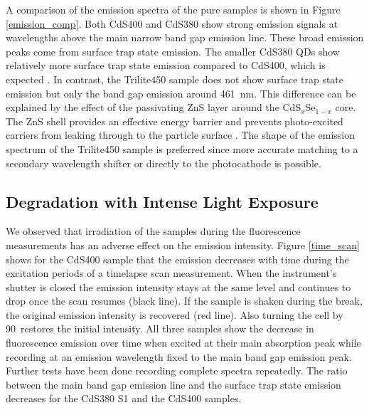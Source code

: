 \documentclass[cits]{JINST}
\begin{document}
A comparison of the emission spectra of the pure samples is shown in Figure \ref{emission_comp}. Both CdS400 and CdS380 show strong emission signals at wavelengths above the main narrow band gap emission line. These broad emission peaks come from surface trap state emission. The smaller CdS380 QDs show relatively more surface trap state emission compared to CdS400, which is expected \cite{capek}. In contrast, the Trilite450 sample does not show surface trap state emission but only the band gap emission around 461~nm. This difference can be explained by the effect of the passivating ZnS layer around the CdS$_x$Se$_{1-x}$ core. The ZnS shell provides an effective energy barrier and prevents photo-excited carriers from leaking through to the particle surface \cite{dabbousi1997}. The shape of the emission spectrum of the Trilite450 sample is preferred since more accurate matching to a secondary wavelength shifter or directly to the photocathode is possible.

\subsection{Degradation with Intense Light Exposure}
We observed that irradiation of the samples during the fluorescence measurements has an adverse effect on the emission intensity. Figure \ref{time_scan} shows for the CdS400 sample that the emission decreases with time during the excitation periods of a timelapse scan measurement. When the instrument's shutter is closed the emission intensity stays at the same level and continues to drop once the scan resumes (black line). If the sample is shaken during the break, the original emission intensity is recovered (red line). Also turning the cell by 90\textdegree ~restores the initial intensity. All three samples show the decrease in fluorescence emission over time when excited at their main absorption peak while recording at an emission wavelength fixed to the main band gap emission peak. Further tests have been done recording complete spectra repeatedly. The ratio between the main band gap emission line and the surface trap state emission decreases for the CdS380 S1 and the CdS400 samples. 
\end{document}
